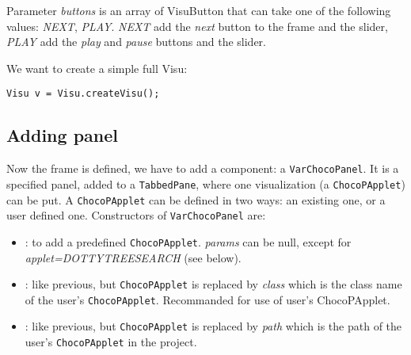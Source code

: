 Parameter \emph{buttons} is an array of VisuButton that can take one of the following values: \emph{NEXT}, \emph{PLAY}. 
\emph{NEXT} add the \emph{next} button to the frame and the slider, \emph{PLAY} add the \emph{play} and \emph{pause} buttons and the slider.

We want to create a simple full Visu:
\begin{lstlisting}
Visu v = Visu.createVisu();
\end{lstlisting}

\subsection{Adding panel}\label{chocoandvisu:addingpanel}\hypertarget{chocoandvisu:addingpanel}{}
Now the frame is defined, we have to add a component: a \texttt{VarChocoPanel}. It is a specified panel, added to a \texttt{TabbedPane}, where one visualization (a \texttt{ChocoPApplet}) can be put.
A \texttt{ChocoPApplet} can be defined in two ways: an existing one, or a user defined one.
Constructors of \texttt{VarChocoPanel} are:
\begin{itemize}
	\item {}: to add a predefined \texttt{ChocoPApplet}. \emph{params} can be null, except for \emph{applet=DOTTYTREESEARCH} (see below).
	\item {}: like previous, but \texttt{ChocoPApplet} is replaced by \emph{class} which is the class name of the user's \texttt{ChocoPApplet}. Recommanded for use of user's ChocoPApplet.
	\item {}: like previous, but \texttt{ChocoPApplet} is replaced by \emph{path} which is the path of the user's \texttt{ChocoPApplet} in the project.
\end{itemize}


